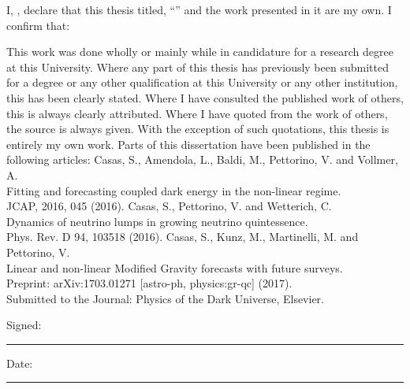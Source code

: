 \documentclass[
11pt, %
english, %
singlespacing, %
headsepline, %
]{MastersDoctoralThesis} %
\begin{document}

\begin{declaration}
\addchaptertocentry{\authorshipname}

\noindent I, \authorname, declare that this thesis titled, \enquote{\ttitle} and the work presented in it are my own. I confirm that:

\begin{outline} 
\1 This work was done wholly or mainly while in candidature for a research degree at this University.
\1 Where any part of this thesis has previously been submitted for a degree or any other qualification at this University or any other institution, this has been clearly stated.
\1 Where I have consulted the published work of others, this is always clearly attributed.
\1 Where I have quoted from the work of others, the source is always given. 
With the exception of such quotations, this thesis is entirely my own work. \done{}
\1 Parts of this dissertation have been published in the following articles:
\2 Casas, S., Amendola, L., Baldi, M., Pettorino, V. and Vollmer, A. \\
   Fitting and forecasting coupled dark energy in the non-linear regime. \\
   JCAP, 2016, 045 (2016).
\2 Casas, S., Pettorino, V. and Wetterich, C. \\ 
   Dynamics of neutrino lumps in growing neutrino quintessence. \\
   Phys. Rev. D 94, 103518 (2016).
\2 Casas, S., Kunz, M., Martinelli, M. and Pettorino, V. \\ 
   Linear and non-linear Modified Gravity forecasts with future surveys. \\ Preprint: arXiv:1703.01271 [astro-ph, physics:gr-qc] (2017). \\
   Submitted to the Journal: Physics of the Dark Universe, Elsevier.
\end{outline}
\vspace{1cm}
\noindent Signed:\\
\rule[0.5em]{25em}{0.5pt} %
 
\noindent Date:\\
\rule[0.5em]{25em}{0.5pt} %
\end{declaration}
\end{document}
